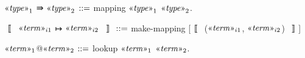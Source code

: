 \begin{notational}[caption={mapping notations}]
$\mvar{type}_1$ ⇛ $\mvar{type}_2$   $\syneq$   mapping $\mvar{type}_1$ $\mvar{type}_2$.

$〚$ $\mvar{term}_{i1}$ ↦ $\mvar{term}_{i2}$ $〛$   $\syneq$   make-mapping [$〚$ ($\mvar{term}_{i1}$, $\mvar{term}_{i2}$) $〛$]

$\mvar{term}_1$@$\mvar{term}_2$   $\syneq$   lookup $\mvar{term}_1$ $\mvar{term}_2$.
\end{notational}
